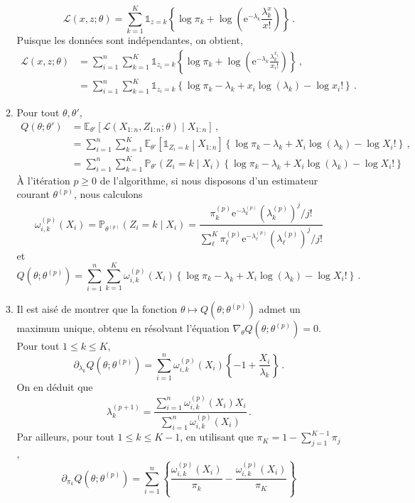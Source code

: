 \documentclass[a4paper,10pt,fleqn]{article}
\newcommand{\1}{\ensuremath{\mathbbm{1}}}
\begin{document}
\begin{enumerate}
\begin{enumerate}
$$
\mathcal{L}(x,z;\theta) = \sum_{k=1}^K \mathds{1}_{z=k}\left\{\log \pi_k + \log \left(\mathrm{e}^{-\lambda_k}\frac{\lambda_k^{x}}{x!}\right)\right\}\,.
$$
Puisque les donn\'ees sont ind\'ependantes, on obtient,
\begin{align*}
\mathcal{L}(x,z;\theta) &= \sum_{i=1}^n\sum_{k=1}^K \mathds{1}_{z_i=k}\left\{\log \pi_k + \log \left(\mathrm{e}^{-\lambda_k}\frac{\lambda_k^{x_i}}{x_i!}\right)\right\}\,,\\
&=\sum_{i=1}^n\sum_{k=1}^K \mathds{1}_{z_i=k}\left\{\log \pi_k - \lambda_k+ x_i\log \left(\lambda_k\right) - \log x_i!\right\}\,.
\end{align*}
\item Pour tout $\theta, \theta'$,
\begin{align*}
Q(\theta;\theta') &= \mathbb{E}_{\theta'}\left[\mathcal{L}(X_{1:n},Z_{1:n};\theta)\middle|X_{1:n}\right] \,,\\
&= \sum_{i=1}^n\sum_{k=1}^K \mathbb{E}_{\theta'}\left[\mathds{1}_{Z_i=k}\middle|X_{1:n}\right]\left\{\log \pi_k - \lambda_k+ X_i\log \left(\lambda_k\right) - \log X_i!\right\}\,,\\
&= \sum_{i=1}^n\sum_{k=1}^K \mathbb{P}_{\theta'}\left(Z_i=k\middle|X_{i}\right)\left\{\log \pi_k - \lambda_k+ X_i\log \left(\lambda_k\right) - \log X_i!\right\}
\end{align*}
\`A l'it\'eration $p\geq 0$ de l'algorithme, si nous disposons d'un estimateur courant $\theta^{(p)}$, nous calculons
$$
\omega_{i,k}^{(p)}(X_i) = \mathbb{P}_{\theta^{(p)}}\left(Z_i=k\middle|X_{i}\right) = \frac{\pi^{(p)}_k \mathrm{e}^{-\lambda^{(p)}_k}(\lambda^{(p)}_k)^{j}/j!}{\sum_{\ell}^K\pi^{(p)}_\ell \mathrm{e}^{-\lambda^{(p)}_\ell}(\lambda^{(p)}_\ell)^{j}/j!}
$$
et 
$$
Q(\theta;\theta^{(p)}) = \sum_{i=1}^n\sum_{k=1}^K \omega_{i,k}^{(p)}(X_i) \left\{\log \pi_k - \lambda_k+ X_i\log \left(\lambda_k\right) - \log X_i!\right\}\,.
$$
\item Il est ais\'e de montrer que la fonction $\theta \mapsto Q(\theta;\theta^{(p)}) $ admet un maximum unique, obtenu en r\'esolvant l'\'equation $\nabla_\theta Q(\theta;\theta^{(p)}) = 0$. Pour tout $1\leq k \leq K$,
$$
\partial_{\lambda_k}Q(\theta;\theta^{(p)}) = \sum_{i=1}^n\omega_{i,k}^{(p)}(X_i) \left\{ - 1+ \frac{X_i}{\lambda_k}\right\}\,.
$$
On en d\'eduit que
$$
\lambda^{(p+1)}_k = \frac{\sum_{i=1}^n\omega_{i,k}^{(p)}(X_i)X_i}{\sum_{i=1}^n\omega_{i,k}^{(p)}(X_i)}\,.
$$
Par ailleurs, pour tout $1\leq k \leq K-1$, en utilisant que $\pi_K = 1 - \sum_{j=1}^{K-1}\pi_j$,
$$
\partial_{\pi_k}Q(\theta;\theta^{(p)}) = \sum_{i=1}^n \left\{\frac{\omega_{i,k}^{(p)}(X_i)}{\pi_k} - \frac{\omega_{i,k}^{(p)}(X_i)}{\pi_K}\right\}
$$
\end{enumerate}
\end{enumerate}
\end{document}
